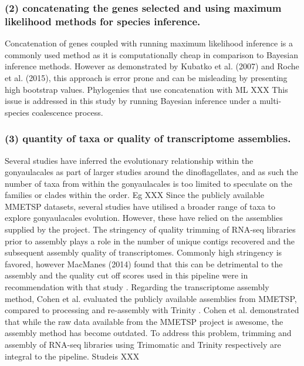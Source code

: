 \documentclass[12pt]{article}
\begin{document}
\subsubsection*{(2) concatenating the genes selected and using maximum likelihood methods for species inference.}
Concatenation of genes coupled with running maximum likelihood inference is a commonly used method as it is computationally cheap in comparison to Bayesian inference methods. 
However as demonstrated by Kubatko et al. (2007) and Roche et al. (2015), this approach is error prone and can be misleading by presenting high bootstrap values.
Phylogenies that use concatenation with ML XXX
This issue is addressed in this study by running Bayesian inference under a multi-species coalescence process.
\subsubsection*{(3) quantity of taxa or quality of transcriptome assemblies.}
Several studies have inferred the evolutionary relationship within the gonyaulacales as part of larger studies around the dinoflagellates, and as such the number of taxa from within the gonyaulacales is too limited to speculate on the families or clades within the order. Eg XXX
Since the publicly available MMETSP datasets, several studies have utilised a broader range of taxa to explore gonyaulacales evolution. 
However, these have relied on the assemblies supplied by the project. 
The stringency of quality trimming of RNA-seq libraries prior to assembly plays a role in the number of unique contigs recovered and the subsequent assembly quality of transcriptomes. 
Commonly high stringency is favored, however MacManes (2014) found that this can be detrimental to the assembly and the quality cut off scores used in this pipeline were in recommendation with that study \cite{macmanes2014optimal}.
Regarding the transcriptome assembly method, Cohen et al. evaluated the publicly available assemblies from MMETSP, compared to processing and re-assembly with Trinity \cite{cohen-reass}. 
Cohen et al. demonstrated that while the raw data available from the MMETSP project is awesome, the assembly method has become outdated. 
To address this problem, trimming and assembly of RNA-seq libraries using Trimomatic and Trinity respectively are integral to the pipeline.
Studeis XXX
\end{document}
